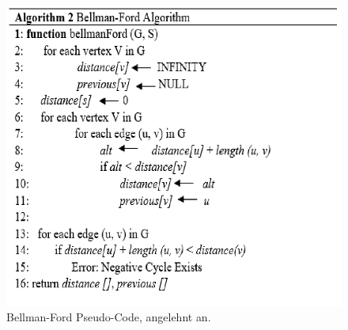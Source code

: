 \begin{figure}[H]
	\centering
	\includegraphics[width=1.0\textwidth]{images/Bellman-Ford-Algorithmus_Pseudo-Code.PNG}
	\caption{Bellman-Ford Pseudo-Code, angelehnt an\cite{Abusalim2020}.}
	\label{fig:Bellman-Ford Pseudo-code}
\end{figure}






